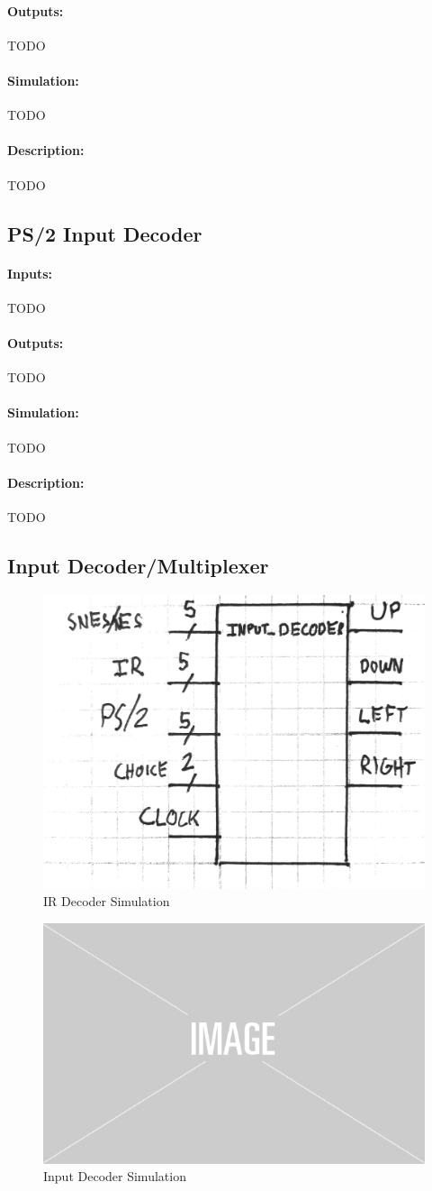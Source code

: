 \documentclass[]{article}
\begin{document}
\paragraph{Outputs:} TODO
\paragraph{Simulation:} TODO
\paragraph{Description:} TODO

\subsection{PS/2 Input Decoder}
\paragraph{Inputs:} TODO
\paragraph{Outputs:} TODO
\paragraph{Simulation:} TODO
\paragraph{Description:} TODO

\subsection{Input Decoder/Multiplexer}
\begin{figure}[H]\centering
    \includegraphics[width=0.5\linewidth]{figures/Input_Decoder_Block.jpg}
    \caption{IR Decoder Simulation}
    \label{fig:irParserBlock}
\end{figure}
\begin{figure}[H]\centering
    \includegraphics[width=0.5\linewidth]{figures/placeholder.png}
    \caption{Input Decoder Simulation}
    \label{fig:irParserSim}
\end{figure}
\end{document}
